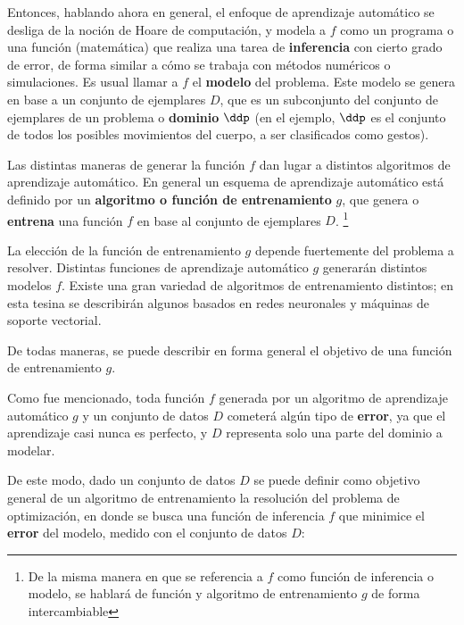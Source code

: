 Entonces, hablando ahora en general, el enfoque de aprendizaje automático se desliga de la noción de Hoare de computación, y modela a $f$ como un programa o una función (matemática) que realiza una tarea de \textbf{inferencia} con cierto grado de error, de forma similar a cómo se trabaja con métodos numéricos o simulaciones. Es usual llamar a $f$ el \textbf{modelo} del problema. Este modelo se genera en base a un conjunto de ejemplares $D$, que es un subconjunto del conjunto de ejemplares de un problema o \textbf{dominio} $\ddp$ (en el ejemplo, $\ddp$ es el conjunto de todos los posibles movimientos del cuerpo, a ser clasificados como gestos).


Las distintas maneras de generar la función $f$ dan lugar a distintos algoritmos de aprendizaje automático. En general un esquema de aprendizaje automático está definido por un \textbf{algoritmo o función de entrenamiento} $g$, que genera o \textbf{entrena} una función $f$ en base al conjunto de ejemplares $D$. \footnote{De la misma manera en que se referencia a  $f$ como función de inferencia o modelo, se hablará de función y algoritmo de entrenamiento $g$ de forma intercambiable}


La elección de la función de entrenamiento $g$ depende fuertemente del problema a resolver. Distintas funciones de aprendizaje automático $g$ generarán distintos modelos $f$. Existe una gran variedad de algoritmos de entrenamiento distintos; en esta tesina se describirán algunos basados en redes neuronales y máquinas de soporte vectorial.

De todas maneras, se puede describir en forma general el objetivo de una función de entrenamiento $g$. 

Como fue mencionado, toda función $f$ generada por un algoritmo de aprendizaje automático $g$ y un conjunto de datos $D$ cometerá algún tipo de \textbf{error}, ya que el aprendizaje casi nunca es perfecto, y $D$ representa solo una parte del dominio a modelar. 

De este modo, dado un conjunto de datos $D$ se puede definir como objetivo general de un algoritmo de entrenamiento la resolución del problema de optimización, en donde se busca una función de inferencia $f$ que minimice el \textbf{error} del modelo, medido con el conjunto de datos $D$:

